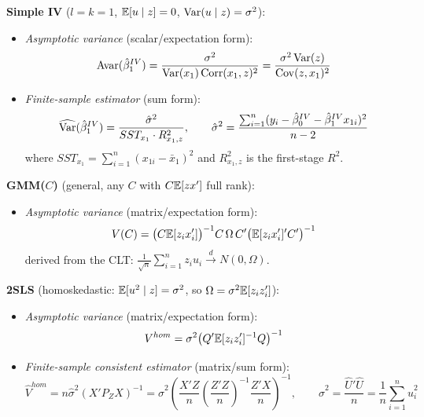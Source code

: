 \begin{remark}
	\textbf{Simple IV} ($l=k=1$, $\mathbb{E}[u\mid z]=0$, $\operatorname{Var}(u\mid z)=\sigma^2$):
	\begin{itemize}
		\item \emph{Asymptotic variance} (scalar/expectation form):
		\[
			\operatorname{Avar}(\hat{\beta}_1^{IV}) = \frac{\sigma^2}{\operatorname{Var}(x_1)\operatorname{Corr}(x_1,z)^2} = \frac{\sigma^2\operatorname{Var}(z)}{\operatorname{Cov}(z,x_1)^2}
		\]
		\item \emph{Finite-sample estimator} (sum form):
		\[
			\widehat{\operatorname{Var}}(\hat{\beta}_1^{IV}) = \frac{\hat{\sigma}^2}{SST_{x_1}\cdot R_{x_1,z}^2}, \qquad \hat{\sigma}^2 = \frac{\sum_{i=1}^{n}(y_i - \hat{\beta}_0^{IV} - \hat{\beta}_1^{IV}x_{1i})^2}{n-2}
		\]
		where $SST_{x_1}=\sum_{i=1}^{n}(x_{1i}-\bar{x}_1)^2$ and $R_{x_1,z}^2$ is the first-stage $R^2$.
	\end{itemize}

	\textbf{GMM($C$)} (general, any $C$ with $C\mathbb{E}[zx']$ full rank):
	\begin{itemize}
		\item \emph{Asymptotic variance} (matrix/expectation form):
		\[
			V(C) = \bigl(C\mathbb{E}[z_ix_i']\bigr)^{-1}C\,\Omega\, C'\bigl(\mathbb{E}[z_ix_i']'C'\bigr)^{-1}
		\]
		derived from the CLT: $\frac{1}{\sqrt{n}}\sum_{i=1}^{n}z_iu_i \xrightarrow{d} N(0,\Omega)$.
	\end{itemize}

	\textbf{2SLS} (homoskedastic: $\mathbb{E}[u^2\mid z]=\sigma^2$, so $\Omega=\sigma^2\mathbb{E}[z_iz_i']$):
	\begin{itemize}
		\item \emph{Asymptotic variance} (matrix/expectation form):
		\[
			V^{hom} = \sigma^2\bigl(Q'\mathbb{E}[z_iz_i']^{-1}Q\bigr)^{-1}
		\]
		\item \emph{Finite-sample consistent estimator} (matrix/sum form):
		\[
			\hat{V}^{hom} = n\hat{\sigma}^2(X'P_ZX)^{-1} = \hat{\sigma}^2\left(\frac{X'Z}{n}\left(\frac{Z'Z}{n}\right)^{-1}\frac{Z'X}{n}\right)^{-1}, \qquad \hat{\sigma}^2 = \frac{\hat{U}'\hat{U}}{n} = \frac{1}{n}\sum_{i=1}^{n}\hat{u}_i^2
		\]
	\end{itemize}


\end{remark}
